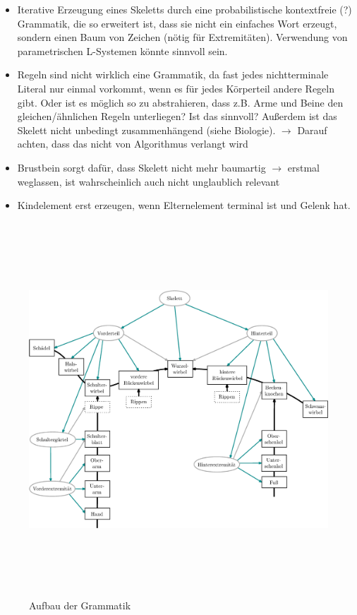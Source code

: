  \begin{itemize}
  \item Iterative Erzeugung eines Skeletts durch eine probabilistische kontextfreie (?) Grammatik, die so erweitert ist, dass sie nicht ein einfaches Wort erzeugt, sondern einen Baum von Zeichen (nötig für Extremitäten). Verwendung von parametrischen L-Systemen \cite{Paramteric_L-Systems} könnte sinnvoll sein.
  
  \item Regeln sind nicht wirklich eine Grammatik, da fast jedes nichtterminale Literal nur einmal vorkommt, wenn es für jedes Körperteil andere Regeln gibt. Oder ist es möglich so zu abstrahieren, dass z.B. Arme und Beine den gleichen/ähnlichen Regeln unterliegen? Ist das sinnvoll? 
  Außerdem ist das Skelett nicht unbedingt zusammenhängend (siehe Biologie). $\rightarrow$ Darauf achten, dass das nicht von Algorithmus verlangt wird
  
  \item Brustbein sorgt dafür, dass Skelett nicht mehr baumartig $\rightarrow$ erstmal weglassen, ist wahrscheinlich auch nicht unglaublich relevant
  
  \item Kindelement erst erzeugen, wenn Elternelement terminal ist und Gelenk hat.
 \end{itemize}
 
 \begin{figure}
  \centering
  \includegraphics[height=14cm]{graphics/grammarGraph}
  \caption{Aufbau der Grammatik}
  \label{grammar_graph}
 \end{figure}


